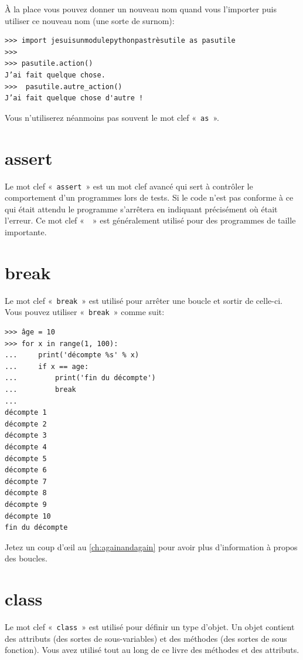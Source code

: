 À la place vous pouvez donner un nouveau nom quand vous l'importer puis utiliser ce nouveau nom (une sorte de surnom):

\begin{Verbatim}[frame=single,rulecolor=\color{gray}]
>>> import jesuisunmodulepythonpastrèsutile as pasutile
>>>
>>> pasutile.action()
J’ai fait quelque chose.
>>>  pasutile.autre_action()
J’ai fait quelque chose d'autre !
\end{Verbatim}

Vous n'utiliserez néanmoins pas souvent le mot clef « \texttt{as} ».

\section*{assert}

Le mot clef « \texttt{assert} » est un mot clef avancé qui sert à contrôler le comportement d'un programmes lors de tests. Si le code n'est pas conforme à ce qui était attendu le programme s'arrêtera en indiquant précisément où était l'erreur. Ce mot clef « \texttt{} » est généralement utilisé pour des programmes de taille importante.

\section*{break}
Le mot clef « \texttt{break} » est utilisé pour arrêter une boucle et sortir de celle-ci. Vous pouvez utiliser « \texttt{break} » comme suit:
\begin{Verbatim}[frame=single,rulecolor=\color{gray}]
>>> âge = 10
>>> for x in range(1, 100):
...     print('décompte %s' % x)
...     if x == age:
...         print('fin du décompte')
...         break
...
décompte 1
décompte 2
décompte 3
décompte 4
décompte 5
décompte 6
décompte 7
décompte 8
décompte 9
décompte 10
fin du décompte
\end{Verbatim}

Jetez un coup d'œil au \autoref{ch:againandagain} pour avoir plus d'information à propos des boucles.

\section*{class}

Le mot clef « \texttt{class} »  est utilisé pour définir un type d'objet. Un objet contient des attributs (des sortes de sous-variables) et des méthodes (des sortes de sous fonction). Vous avez utilisé tout au long de ce livre des méthodes et des attributs. 

